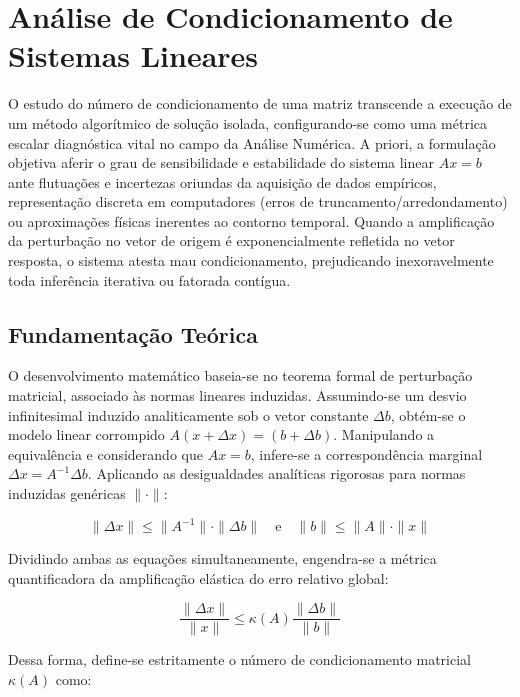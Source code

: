 \section{Análise de Condicionamento de Sistemas Lineares}

O estudo do número de condicionamento de uma matriz transcende a execução de um método algorítmico de solução isolada, configurando-se como uma métrica escalar diagnóstica vital no campo da Análise Numérica. A priori, a formulação objetiva aferir o grau de sensibilidade e estabilidade do sistema linear $Ax = b$ ante flutuações e incertezas oriundas da aquisição de dados empíricos, representação discreta em computadores (erros de truncamento/arredondamento) ou aproximações físicas inerentes ao contorno temporal. Quando a amplificação da perturbação no vetor de origem é exponencialmente refletida no vetor resposta, o sistema atesta mau condicionamento, prejudicando inexoravelmente toda inferência iterativa ou fatorada contígua.

\subsection{Fundamentação Teórica}

O desenvolvimento matemático baseia-se no teorema formal de perturbação matricial, associado às normas lineares induzidas. Assumindo-se um desvio infinitesimal induzido analiticamente sob o vetor constante $\Delta b$, obtém-se o modelo linear corrompido $A(x + \Delta x) = (b + \Delta b)$. Manipulando a equivalência e considerando que $Ax = b$, infere-se a correspondência marginal $\Delta x = A^{-1} \Delta b$. Aplicando as desigualdades analíticas rigorosas para normas induzidas genéricas $\| \cdot \|$:

\begin{equation}
    \| \Delta x \| \leq \| A^{-1} \| \cdot \| \Delta b \| \quad \text{e} \quad \| b \| \leq \| A \| \cdot \| x \|
\end{equation}

Dividindo ambas as equações simultaneamente, engendra-se a métrica quantificadora da amplificação elástica do erro relativo global:

\begin{equation}
    \frac{\| \Delta x \|}{\| x \|} \leq \kappa(A) \frac{\| \Delta b \|}{\| b \|}
\end{equation}

Dessa forma, define-se estritamente o número de condicionamento matricial $\kappa(A)$ como:


